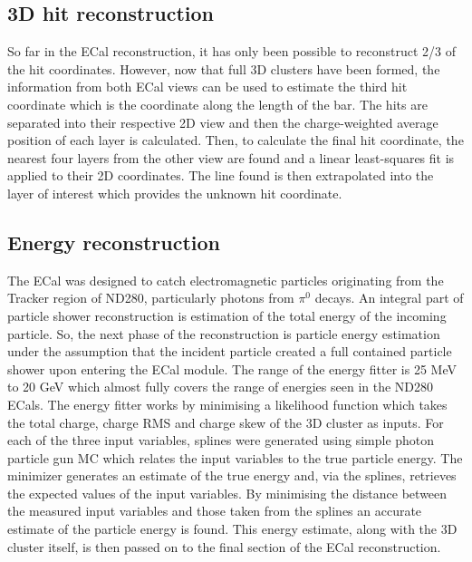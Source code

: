 \subsection{3D hit reconstruction}
\label{subsec:ECal3DHitReconstruction}
So far in the ECal reconstruction, it has only been possible to reconstruct 2/3 of the hit coordinates.  However, now that full 3D clusters have been formed, the information from both ECal views can be used to estimate the third hit coordinate which is the coordinate along the length of the bar.
\newline
\newline
The hits are separated into their respective 2D view and then the charge-weighted average position of each layer is calculated.  Then, to calculate the final hit coordinate, the nearest four layers from the other view are found and a linear least-squares fit is applied to their 2D coordinates.  The line found is then extrapolated into the layer of interest which provides the unknown hit coordinate.

\subsection{Energy reconstruction}
\label{subsec:ECalEnergyReconstruction}
The ECal was designed to catch electromagnetic particles originating from the Tracker region of ND280, particularly photons from $\pi^0$ decays.  An integral part of particle shower reconstruction is estimation of the total energy of the incoming particle.  So, the next phase of the reconstruction is particle energy estimation under the assumption that the incident particle created a full contained particle shower upon entering the ECal module.  The range of the energy fitter is 25 MeV to 20 GeV which almost fully covers the range of energies seen in the ND280 ECals.  The energy fitter works by minimising a likelihood function which takes the total charge, charge RMS and charge skew of the 3D cluster as inputs.  For each of the three input variables, splines were generated using simple photon particle gun MC which relates the input variables to the true particle energy.  The minimizer generates an estimate of the true energy and, via the splines, retrieves the expected values of the input variables.  By minimising the distance between the measured input variables and those taken from the splines an accurate estimate of the particle energy is found.  This energy estimate, along with the 3D cluster itself, is then passed on to the final section of the ECal reconstruction.

